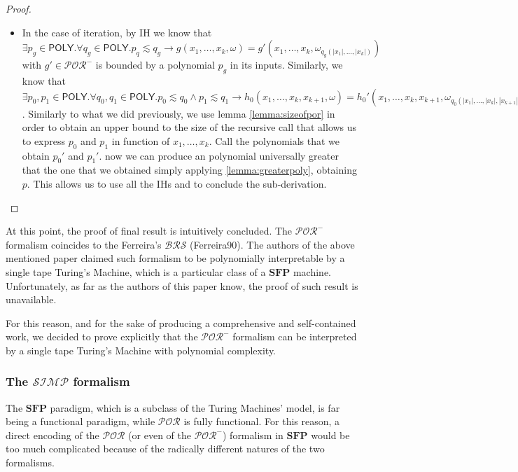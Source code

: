 \documentclass[10pt]{amsart}
\newcommand{\POLY}{\mathsf{POLY}}
\newcommand{\SFP}{\mathbf{SFP}}
\newcommand{\POR}{\mathcal{POR}}
\newcommand{\SIMP}{\mathcal{SIMP}}
\newcommand{\vone}{x}
\newcommand{\oone}{\omega}
\newcommand{\BRS}{\mathcal{BRS}}
\begin{document}
\begin{proof}
\begin{itemize}
\item In the case of iteration, by IH we know that $\exists p_g \in \POLY.\forall q_g \in \POLY. p_q \lesssim q_g \to g(\vone_1, \ldots, \vone_k, \oone)= g'(\vone_1, \ldots, \vone_k, \oone_{q_g(|\vone_1|, \ldots, |\vone_k|)})$ with $g' \in \POR^-$ is bounded by a polynomial $p_g$ in its inputs. Similarly, we know that $\exists p_0, p_1 \in \POLY.\forall q_0, q_1 \in \POLY. p_0 \lesssim q_0 \land p_1 \lesssim q_1 \to h_0(\vone_1, \ldots, \vone_k, \vone_{k+1}, \oone)= h_0'(\vone_1, \ldots, \vone_k, \vone_{k+1}, \oone_{q_0(|\vone_1|, \ldots, |\vone_k|, |\vone_{k+1}|)}) \land h_1(\vone_1, \ldots, \vone_k,  \vone_{k+1}, \oone)= h_1'(\vone_1, \ldots, \vone_k,\vone_{k+1},  \oone_{p_1(|\vone_1|, \ldots, |\vone_k|, |\vone_{k+1}|)})$. Similarly to what we did previously, we use lemma \ref{lemma:sizeofpor} in order to obtain an upper bound to the size of the recursive call that allows us to express $p_0$ and $p_1$ in function of $\vone_1, \ldots, \vone_k$. Call the polynomials that we obtain $p_0'$ and $p_1'$. now we can produce an polynomial universally greater that the one that we obtained simply applying \ref{lemma:greaterpoly}, obtaining $p$. This allows us to use all the IHs and to conclude the sub-derivation.
\end{itemize}
\end{proof}

At this point, the proof of final result is intuitively concluded. The $\POR^-$ formalism coincides to the Ferreira's $\BRS$ (Ferreira90). The authors of the above mentioned paper claimed such formalism to be polynomially interpretable by a single tape Turing's Machine, which is a particular class of a $\SFP$ machine. Unfortunately, as far as the authors of this paper know, the proof of such result is unavailable.

For this reason, and for the sake of producing a comprehensive and self-contained work, we decided to prove explicitly that the $\POR^-$ formalism can be interpreted by a single tape Turing's Machine with polynomial complexity.

\subsubsection{The $\SIMP$ formalism}

The $\SFP$ paradigm, which is a subclass of the Turing Machines' model, is far being a functional paradigm, while $\POR$ is fully functional. For this reason, a direct encoding of the $\POR$ (or even of the $\POR^-$) formalism in $\SFP$ would be too much complicated because of the radically different natures of the two formalisms.
\end{document}
